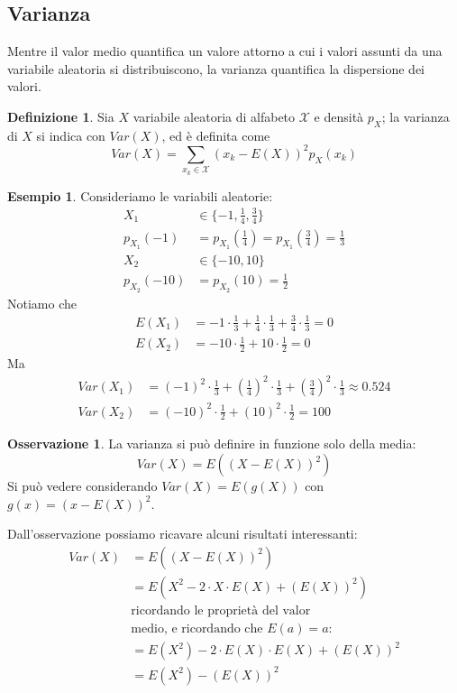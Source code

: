 \documentclass{article}
\theoremstyle{plain}
\theoremstyle{definition}
\newtheorem{definizione}{Definizione}[section]
\newtheorem{osservazione}{Osservazione}[section]
\newtheorem{esempio}{Esempio}[section]
\theoremstyle{remark}
\begin{document}
\subsection{Varianza} %
\label{sub:varianza}
Mentre il valor medio quantifica un valore attorno a cui i valori assunti da una variabile aleatoria si distribuiscono, la varianza quantifica la dispersione dei valori.
\begin{definizione}
	Sia $X$ variabile aleatoria di alfabeto $\mathcal{X}$ e densità $p_X$; la varianza di $X$ si indica con $Var(X)$, ed è definita come
	\begin{equation*}
		Var(X)=\sum_{x_k\in\mathcal{X}}(x_k-E(X))^2p_X(x_k)
	\end{equation*}
\end{definizione}
\begin{esempio}
	Consideriamo le variabili aleatorie:
	\begin{align*}
		X_1&\in\{-1,\frac{1}{4},\frac{3}{4}\}\\
		p_{X_1}(-1)&=p_{X_1}(\frac{1}{4})=p_{X_1}(\frac{3}{4})=\frac{1}{3}\\
		X_2&\in\{-10,10\}\\
		p_{X_2}(-10)&=p_{X_2}(10)=\frac{1}{2}
	\end{align*}
	Notiamo che
	\begin{align*}
		E(X_1)&=-1\cdot\frac{1}{3}+\frac{1}{4}\cdot\frac{1}{3}+\frac{3}{4}\cdot\frac{1}{3}=0\\
		E(X_2)&=-10\cdot\frac{1}{2}+10\cdot\frac{1}{2}=0
	\end{align*}
	Ma
	\begin{align*}
		Var(X_1)&=(-1)^2\cdot\frac{1}{3}+(\frac{1}{4})^2\cdot\frac{1}{3}+(\frac{3}{4})^2\cdot\frac{1}{3}\approx0.524\\
		Var(X_2)&=(-10)^2\cdot\frac{1}{2}+(10)^2\cdot\frac{1}{2}=100
	\end{align*}
\end{esempio}
\begin{osservazione}
	La varianza si può definire in funzione solo della media:
	\begin{equation*}
		Var(X)=E((X-E(X))^2)
	\end{equation*}
	Si può vedere considerando $Var(X)=E(g(X))$ con $g(x)=(x-E(X))^2$.
\end{osservazione}
Dall'osservazione possiamo ricavare alcuni risultati interessanti:
\begin{align*}
	Var(X)&=E((X-E(X))^2)\\
	&=E(X^2-2\cdot X\cdot E(X)+(E(X))^2)\\
	&\text{ricordando le proprietà del valor}\\
	&\text{medio, e ricordando che $E(a)=a$:}\\
	&=E(X^2)-2\cdot E(X)\cdot E(X)+(E(X))^2\\
	&=E(X^2)-(E(X))^2
\end{align*}
\end{document}
